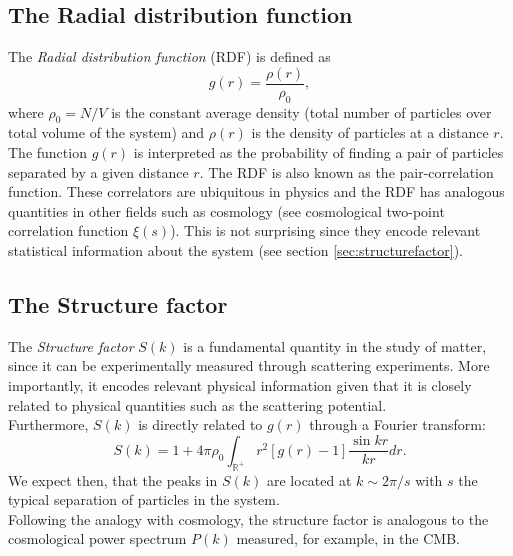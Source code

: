\documentclass[%
aip,
jmp,%
amsmath,amssymb,
preprint,%
reprint,%
notitlepage,
a4paper]{revtex4-1}
\begin{document}
\subsection{The Radial distribution function}
The \textit{Radial distribution function} (RDF) is defined as
\begin{equation}
g(r) = \frac{\rho(r)}{\rho_0},
\end{equation}
where $\rho_0 = N/V$ is the constant average density (total number of particles over total volume of the system) and $\rho(r)$ is the density of particles at a distance $r$. The function $g(r)$ is interpreted as the probability of finding a pair of particles separated by a given distance $r$. The RDF is also known as the pair-correlation function. These correlators are ubiquitous in physics and the RDF has analogous quantities in other fields such as cosmology (see cosmological two-point correlation function $\xi(s)$\cite{Peebles1980}). This is not surprising since they encode relevant statistical information about the system (see section \ref{sec:structurefactor}).\\
\subsection{The Structure factor \label{sec:structurefactor}}
The \textit{Structure factor} $S(k)$ is a fundamental quantity in the study of matter, since it can be experimentally measured through scattering experiments\cite{Simon2013}. More importantly, it encodes relevant physical information given that it is closely related to physical quantities such as the scattering potential.\\
Furthermore, $S(k)$ is directly related to $g(r)$ through a Fourier transform:
\begin{equation}
S(k) = 1 + 4\pi\rho_0\int_{\mathbb{R}^+}r^2 [g(r) - 1] \frac{\sin kr}{kr} dr.
\end{equation}
We expect then, that the peaks in $S(k)$ are located at $k\sim 2\pi/s$ with $s$ the typical separation of particles in the system.\\
Following the analogy with cosmology, the structure factor is analogous to the cosmological power spectrum $P(k)$ measured, for example, in the CMB\cite{Peebles1980}.
\end{document}
